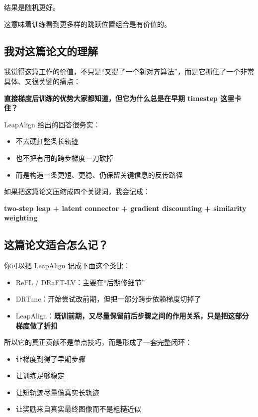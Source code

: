结果是随机更好。

这意味着训练看到更多样的跳跃位置组合是有价值的。

\subsection{我对这篇论文的理解}

我觉得这篇工作的价值，不只是“又提了一个新对齐算法”，而是它抓住了一个非常具体、又很关键的痛点：

\textbf{直接梯度后训练的优势大家都知道，但它为什么总是在早期 timestep 这里卡住？}

LeapAlign 给出的回答很务实：

\begin{itemize}[leftmargin=1.5em]
  \item 不去硬扛整条长轨迹
  \item 也不把有用的跨步梯度一刀砍掉
  \item 而是构造一条更短、更稳、仍保留关键信息的反传路径
\end{itemize}

如果把这篇论文压缩成四个关键词，我会记成：

\textbf{two-step leap + latent connector + gradient discounting + similarity weighting}

\subsection{这篇论文适合怎么记？}

你可以把 LeapAlign 记成下面这个类比：

\begin{itemize}[leftmargin=1.5em]
  \item ReFL / DRaFT-LV：主要在“后期修细节”
  \item DRTune：开始尝试改前期，但把一部分跨步依赖梯度切掉了
  \item LeapAlign：\textbf{既训前期，又尽量保留前后步骤之间的作用关系，只是把这部分梯度做了折扣}
\end{itemize}

所以它的真正贡献不是单点技巧，而是形成了一套完整闭环：

\begin{itemize}[leftmargin=1.5em]
  \item 让梯度到得了早期步骤
  \item 让训练足够稳定
  \item 让短轨迹尽量像真实长轨迹
  \item 让奖励来自真实最终图像而不是粗糙近似
\end{itemize}

